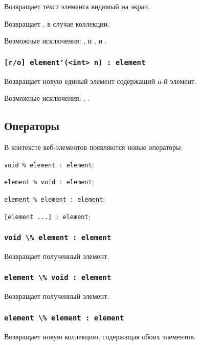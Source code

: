 Возвращает текст элемента видимый на экран. 

\code{[icL]} Возвращает \listtype, в случае коллекции.

Возможные исключения: ,  и ,  и .

\subsubsection{\lstinline|[r/o] element'(<int> n) : element|}

Возвращает новую единый элемент содержащий n-й элемент.

Возможные исключения: , .

\subsection{Операторы}

В контексте веб-элементов появляются новые операторы:
\begin{icItems}
	\item \lstinline|void % element : element|;
	\item \lstinline|element % void : element|;
	\item \lstinline|element % element : element|;
	\item \lstinline|[element ...] : element|;
\end{icItems}

\subsubsection{\lstinline|void \% element : element|}

Возвращает полученный элемент.

\subsubsection{\lstinline|element \% void : element|}

Возвращает полученный элемент.

\subsubsection{\lstinline|element \% element : element|}

Возвращает новую коллекцию, содержащая обоих элементов.

